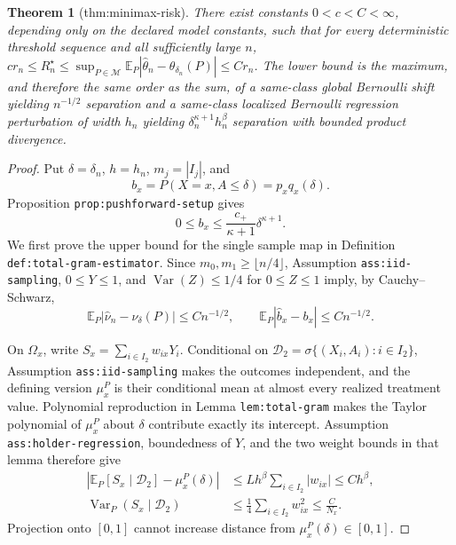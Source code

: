 \documentclass{article}
\newtheorem{theorem}{Theorem}
\begin{document}
\begin{theorem}[thm:minimax-risk]\label{thm:minimax-risk}
There exist constants \(0<c<C<\infty\), depending only on the declared model constants, such that for every deterministic threshold sequence and all sufficiently large \(n\), \(c r_n\leq R_n^\star\leq\sup_{P\in\mathcal M}\mathbb E_P|\widehat\theta_n-\theta_{\delta_n}(P)|\leq C r_n\). The lower bound is the maximum, and therefore the same order as the sum, of a same-class global Bernoulli shift yielding \(n^{-1/2}\) separation and a same-class localized Bernoulli regression perturbation of width \(h_n\) yielding \(\delta_n^{\kappa+1}h_n^\beta\) separation with bounded product divergence.
\end{theorem}
\begin{proof}
Put \(\delta=\delta_n\), \(h=h_n\), \(m_j=|I_j|\), and
\[
 b_x=P(X=x,A\leq\delta)=p_xq_x(\delta).
\]
Proposition \texttt{prop:pushforward-setup} gives
\[
 0\leq b_x\leq \frac{c_+}{\kappa+1}\delta^{\kappa+1}. \tag{1}
\]
We first prove the upper bound for the single sample map in Definition \texttt{def:total-gram-estimator}.  Since \(m_0,m_1\geq\lfloor n/4\rfloor\), Assumption \texttt{ass:iid-sampling}, \(0\leq Y\leq1\), and \(\operatorname{Var}(Z)\leq1/4\) for \(0\leq Z\leq1\) imply, by Cauchy--Schwarz,
\[
 \mathbb E_P|\widehat\nu_n-\nu_\delta(P)|\leq Cn^{-1/2},
 \qquad
 \mathbb E_P|\widehat b_x-b_x|\leq Cn^{-1/2}. \tag{2}
\]

On \(\Omega_x\), write \(S_x=\sum_{i\in I_2}w_{ix}Y_i\).  Conditional on \(\mathscr D_2=\sigma\{(X_i,A_i):i\in I_2\}\), Assumption \texttt{ass:iid-sampling} makes the outcomes independent, and the defining version \(\mu_x^P\) is their conditional mean at almost every realized treatment value.  Polynomial reproduction in Lemma \texttt{lem:total-gram} makes the Taylor polynomial of \(\mu_x^P\) about \(\delta\) contribute exactly its intercept.  Assumption \texttt{ass:holder-regression}, boundedness of \(Y\), and the two weight bounds in that lemma therefore give
\[
 \begin{aligned}
 \left|\mathbb E_P[S_x\mid\mathscr D_2]-\mu_x^P(\delta)\right|
 &\leq Lh^\beta\sum_{i\in I_2}|w_{ix}|\leq Ch^\beta,\\
 \operatorname{Var}_P(S_x\mid\mathscr D_2)
 &\leq\frac14\sum_{i\in I_2}w_{ix}^2\leq\frac{C}{N_x}.
 \end{aligned} \tag{3}
\]
Projection onto \([0,1]\) cannot increase distance from \(\mu_x^P(\delta)\in[0,1]\).


\end{proof}
\end{document}
